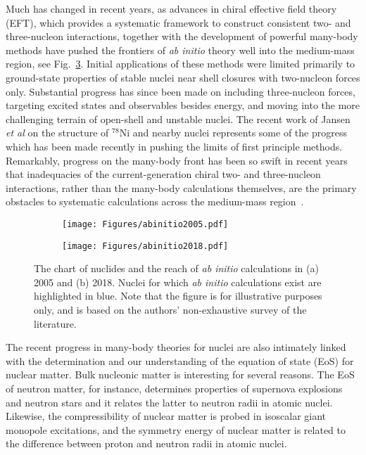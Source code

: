 \documentclass[10pt]{article}
\begin{document}
Much has changed in recent years, as advances in chiral effective
field theory (EFT), which provides a systematic framework to construct
consistent two- and three-nucleon
interactions,
together with the development of powerful many-body methods have
pushed the
frontiers of \emph{ab initio} theory well into the medium-mass
region, see Fig.~\ref{fig:abinitio}. 
Initial applications of these methods were limited primarily to ground-state
properties of stable nuclei near shell closures with two-nucleon
forces only. Substantial progress has since been made on including
three-nucleon forces, targeting excited states and observables besides
energy, and moving into the more
challenging terrain of open-shell and unstable
nuclei. %
The recent work of Jansen {\em et al} \cite{jansenprl2016} on the structure of $^{78}$Ni and nearby nuclei represents some of the progress which has been made recently in pushing the limits of first principle methods. Remarkably,
progress on the many-body front has been so swift in recent years that
inadequacies of the current-generation chiral two- and three-nucleon
interactions, rather than the many-body calculations themselves, are
the primary obstacles to systematic calculations across the
medium-mass region~\cite{Ekstrom2015}.

\begin{figure}[t!]
\centering
   \begin{subfigure}[t]{.5\textwidth}
   \centering
  \texttt{[image: Figures/abinitio2005.pdf]}
   \caption{   \label{fig:abinitio2005} }
\end{subfigure}%
\begin{subfigure}[t]{.5\textwidth}
\centering
  \texttt{[image: Figures/abinitio2018.pdf]}
   \caption{\label{fig:abinitio2015}}
\end{subfigure}
\caption{\label{fig:abinitio}The chart of nuclides and the reach of \emph{ab initio} calculations in (a) 2005 and (b) 2018. Nuclei for which \emph{ab initio} calculations exist are highlighted in blue. Note that the figure is for illustrative purposes only, and is based on the authors' non-exhaustive survey of the literature.}
\end{figure}

The recent progress in many-body theories for nuclei are also
intimately linked with the determination and our understanding of the
equation of state (EoS) for nuclear matter.  Bulk nucleonic matter is
interesting for several reasons. The EoS of neutron matter, for
instance, determines properties of supernova explosions and neutron
stars and it relates the latter to neutron radii in atomic
nuclei. Likewise, the compressibility of nuclear matter is probed in
isoscalar giant monopole excitations, and the symmetry energy of
nuclear matter is related to the difference between proton and neutron
radii in atomic nuclei.
\end{document}
